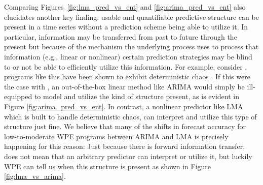 

Comparing Figures~\ref{fig:lma_pred_vs_ent} and
\ref{fig:arima_pred_vs_ent} also elucidates another key finding:
usable and quantifiable predictive structure can be present in a time
series without a prediction scheme being able to utilize it. In
particular, information may be transferred from past to future through
the present but because of the mechanism the underlying process uses
to process that information (e.g., linear or nonlinear) certain
prediction strategies may be blind to or not be able to efficiently
utilize this information. For example, consider \col, programs like
this have been shown to exhibit deterministic chaos
\cite{mytkowicz09}. If this were the case with \col, an out-of-the-box
linear method like ARIMA would simply be ill-equipped to model and
utilize the kind of structure present, as is evident in Figure
\ref{fig:arima_pred_vs_ent}. In contrast, a nonlinear predictor like
LMA which is built to handle deterministic chaos, can interpret and
utilize this type of structure just fine. We believe that many of the
shifts in forecast accuracy for low-to-moderate WPE programs between
ARIMA and LMA is precisely happening for this reason: Just because
there is forward information transfer, does not mean that an arbitrary
predictor can interpret or utilize it, but luckily WPE can tell us
when this structure is present as shown in Figure
\ref{fig:lma_vs_arima}.




